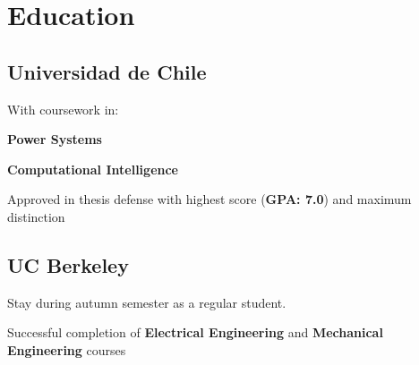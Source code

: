 \section{Education \faGraduationCap{}}

\subsection{Universidad de Chile}
With coursework in:
\vspace{\topsep} 
\begin{tightemize}
\item \textbf{Power Systems}
\item \textbf{Computational Intelligence}
\end{tightemize}
Approved in thesis defense with highest score (\textbf{GPA: 7.0}) and maximum distinction
\sectionsep
\subsection{UC Berkeley}
Stay during autumn semester as a regular student.
\begin{tightemize}
\item Successful completion of \textbf{Electrical Engineering} and \textbf{Mechanical Engineering} courses
\end{tightemize}
\sectionsep

